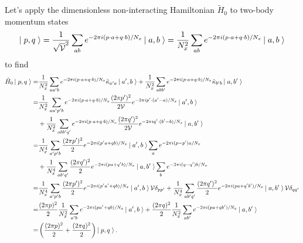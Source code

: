 Let's apply the dimensionless non-interacting Hamiltonian $\tilde{H}_0$ to two-body momentum states
\begin{equation}
    \left|\;p,q\;\right\rangle 
    =
    \frac{1}{\sqrt{\mathcal{V}}^2}\sum_{ab} e^{-2\pi i(p\cdot a + q \cdot b)/N_x} \left|\;a,b\;\right\rangle
    =
    \frac{1}{N_x^2}\sum_{ab} e^{-2\pi i(p\cdot a + q \cdot b)/N_x} \left|\;a,b\;\right\rangle
\end{equation}
to find
\begin{align}
    \tilde{H}_0 \left|\;p,q\;\right\rangle
    =&
			\frac{1}{N_x^2} \sum_{aa'b} e^{-2\pi i(p\cdot a + q \cdot b)/N_x} \tilde{\kappa}_{a'a}\left|\;a',b\;\right\rangle
		+   \frac{1}{N_x^2} \sum_{abb'} e^{-2\pi i(p\cdot a + q \cdot b)/N_x} \tilde{\kappa}_{b'b}\left|\;a,b'\;\right\rangle
    \nonumber\\
    =&
			\frac{1}{N_x^2} \sum_{aa'p'b} e^{-2\pi i(p\cdot a + q \cdot b)/N_x} \frac{(2\pi p')^2}{2\mathcal{V}} e^{-2\pi i p'\cdot(a'-a)/N_x}\left|\;a',b\;\right\rangle
			\nonumber\\&
		+   \frac{1}{N_x^2} \sum_{abb'q'} e^{-2\pi i(p\cdot a + q \cdot b)/N_x} \frac{(2\pi q')^2}{2\mathcal{V}} e^{-2\pi i q'\cdot(b'-b)/N_x}\left|\;a,b'\;\right\rangle
    \\
    =&
			\frac{1}{N_x^4} \sum_{a'p'b} \frac{(2\pi p')^2}{2} e^{-2\pi i(p'a+qb)/N_x} \left|\;a',b\;\right\rangle \sum_{a} e^{-2\pi i(p-p')a/N_x}
			\nonumber\\&
		+   \frac{1}{N_x^4} \sum_{ab'q'} \frac{(2\pi q')^2}{2} e^{-2\pi i(pa+q'b)/N_x} \left|\;a,b'\;\right\rangle \sum_{b} e^{-2\pi i(q-q')b/N_x}
    \\
    =&
			\frac{1}{N_x^4} \sum_{a'p'b} \frac{(2\pi p')^2}{2} e^{-2\pi i(p'a'+qb)/N_x} \left|\;a',b\;\right\rangle \mathcal{V} \delta_{pp'}
		+   \frac{1}{N_x^4} \sum_{ab'q'} \frac{(2\pi q')^2}{2} e^{-2\pi i(pa+q'b')/N_x} \left|\;a,b'\;\right\rangle \mathcal{V} \delta_{qq'}
    \\
    =&
			\frac{(2\pi p)^2}{2} \frac{1}{N_x^2}\sum_{a'b} e^{-2\pi i(pa'+qb)/N_x} \left|\;a',b\;\right\rangle
		+   \frac{(2\pi q)^2}{2} \frac{1}{N_x^2}\sum_{ab'} e^{-2\pi i(pa+qb')/N_x} \left|\;a,b'\;\right\rangle
    \\
    =&
		\left(\frac{(2\pi p)^2}{2} + \frac{(2\pi q)^2}{2}\right) \left|\;p,q\;\right\rangle.
\end{align}

